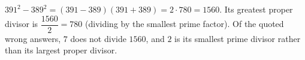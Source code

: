 $391^2-389^2=(391-389)(391+389)=2\cdot780=1560$. Its greatest proper divisor is $\dfrac{1560}{2}=\boxed{780}$ (dividing by the smallest prime factor). Of the quoted wrong answers, $7$ does not divide $1560$, and $2$ is its smallest prime divisor rather than its largest proper divisor.

